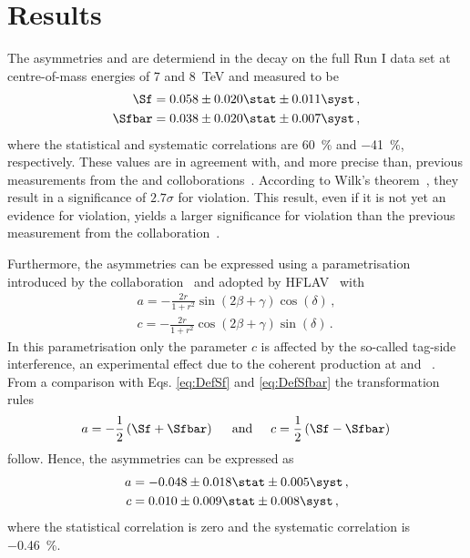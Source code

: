 \chapter{Results}

\linespread{1.08}\selectfont
The \CP asymmetries \Sf and \Sfbar are determiend in the \BdToDpi decay on the full \lhcb Run I data set at centre-of-mass energies of \num{7} and \SI{8}{\tera\electronvolt} and measured to be
\begin{equation}
\begin{aligned}
\Sf&=0.058\pm0.020\stat\pm0.011\syst\,,\\
\Sfbar&=0.038\pm0.020\stat\pm0.007\syst\,,
\end{aligned}
\end{equation}
where the statistical and systematic correlations are \SI{60}{\percent} and \SI{-41}{\percent}, respectively.
These values are in agreement with, and more precise than, previous measurements from the \belle and \babar colloborations~\cite{Ronga:2006hv,Aubert:2006tw}.
According to Wilk's theorem~\cite{wilks1938}, they result in a significance of $2.7\sigma$ for \mbox{\CP violation}.
This result, even if it is not yet an evidence for \CP violation, yields a larger significance for \CP violation than the previous measurement from the \belle collaboration~\cite{Ronga:2006hv}.

Furthermore, the \CP asymmetries can be expressed using a parametrisation introduced by the \babar collaboration~\cite{Aubert:2006tw} and adopted by HFLAV~\cite{HFLAV2016} with
\begin{equation}
\begin{aligned}
a=-\frac{2r}{1+r^2}\sin\!\left(2\beta+\gamma\right)\cos\!\left(\delta\right)\,,\\
c=-\frac{2r}{1+r^2}\cos\!\left(2\beta+\gamma\right)\sin\!\left(\delta\right)\,.
\end{aligned}
\end{equation}
In this parametrisation only the parameter $c$ is affected by the so-called tag-side interference, an experimental effect due to the coherent \Bz\Bzb production at \belle and \babar~\cite{Long:2003wq}.
From a comparison with Eqs. \eqref{eq:DefSf} and \eqref{eq:DefSfbar} the transformation rules
\begin{equation}
a=-\frac{1}{2}\left(\Sf+\Sfbar\right)\hspace{0.5cm}\text{and}\hspace{0.5cm}c=\frac{1}{2}\left(\Sf-\Sfbar\right)\\
\end{equation}
follow.
Hence, the \CP asymmetries can be expressed as
\begin{equation}
\begin{aligned}
a&=-0.048\pm0.018\stat\pm0.005\syst\,,\\
c&=0.010\pm0.009\stat\pm0.008\syst\,,\\
\end{aligned}
\end{equation}
where the statistical correlation is zero and the systematic correlation is \SI{-0.46}{\percent}.

